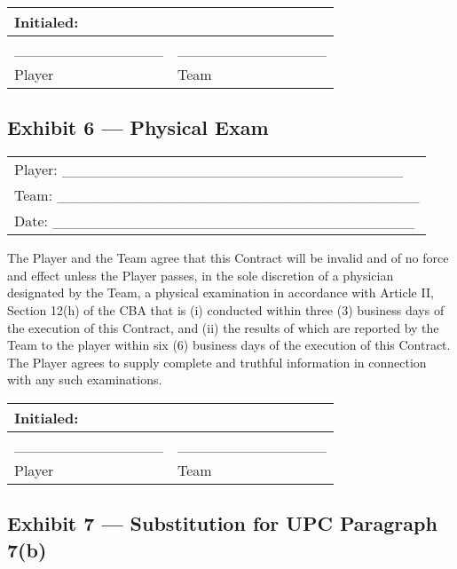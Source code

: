 \documentclass[
]{book}
\begin{document}
\begin{longtable}[]{@{}ll@{}}
\toprule()
Initialed: & \\
\midrule()
\endhead
\_\_\_\_\_\_\_\_\_\_\_\_\_\_ & \_\_\_\_\_\_\_\_\_\_\_\_\_\_ \\
Player & Team \\
\bottomrule()
\end{longtable}

\newpage

\hypertarget{exhibit-6-physical-exam}{%
\subsection{Exhibit 6 --- Physical Exam}\label{exhibit-6-physical-exam}}

\begin{longtable}[]{@{}l@{}}
\toprule()
\endhead
Player: \_\_\_\_\_\_\_\_\_\_\_\_\_\_\_\_\_\_\_\_\_\_\_\_\_\_\_\_\_\_\_\_ \\
Team: \_\_\_\_\_\_\_\_\_\_\_\_\_\_\_\_\_\_\_\_\_\_\_\_\_\_\_\_\_\_\_\_\_\_ \\
Date: \_\_\_\_\_\_\_\_\_\_\_\_\_\_\_\_\_\_\_\_\_\_\_\_\_\_\_\_\_\_\_\_\_\_ \\
\bottomrule()
\end{longtable}

The Player and the Team agree that this Contract will be invalid and of no force and effect unless the Player passes, in the sole discretion of a physician designated by the Team, a physical examination in accordance with Article II, Section 12(h) of the CBA that is (i) conducted within three (3) business days of the execution of this Contract, and (ii) the results of which are reported by the Team to the player within six (6) business days of the execution of this Contract. The Player agrees to supply complete and truthful information in connection with any such examinations.

\begin{longtable}[]{@{}ll@{}}
\toprule()
Initialed: & \\
\midrule()
\endhead
\_\_\_\_\_\_\_\_\_\_\_\_\_\_ & \_\_\_\_\_\_\_\_\_\_\_\_\_\_ \\
Player & Team \\
\bottomrule()
\end{longtable}

\newpage

\hypertarget{exhibit-7-substitution-for-upc-paragraph-7b}{%
\subsection{Exhibit 7 --- Substitution for UPC Paragraph 7(b)}\label{exhibit-7-substitution-for-upc-paragraph-7b}}
\end{document}
